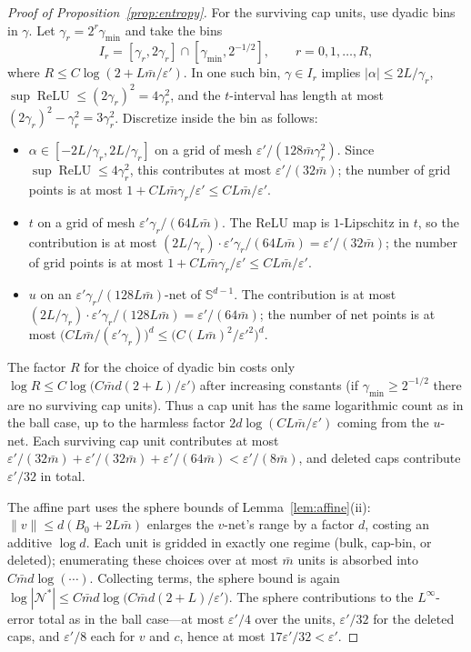 \documentclass[11pt,reqno]{amsart}
\theoremstyle{plain}
\theoremstyle{definition}
\theoremstyle{remark}
\newcommand{\Sd}{\mathbb{S}^{d-1}}
\newcommand{\eps}{\varepsilon}
\newcommand{\relu}{\operatorname{ReLU}}
\newcommand{\NN}{\mathcal{N}}
\begin{document}
\begin{proof}[Proof of Proposition~\textup{\ref{prop:entropy}}]
For the surviving cap units, use dyadic bins in $\gamma$.  Let $\gamma_r=2^r\gamma_{\min}$ and take the bins
\[
        I_r=[\gamma_r,2\gamma_r]\cap[\gamma_{\min},2^{-1/2}],\qquad r=0,1,\dots,R,
\]
where $R\le C\log(2+L\bar m/\eps')$.  In one such bin, $\gamma\in I_r$ implies $|\alpha|\le2L/\gamma_r$, $\sup\relu\le(2\gamma_r)^2=4\gamma_r^2$, and the $t$-interval has length at most $(2\gamma_r)^2-\gamma_r^2=3\gamma_r^2$.  Discretize inside the bin as follows:
\begin{itemize}
\item $\alpha\in[-2L/\gamma_r,2L/\gamma_r]$ on a grid of mesh $\eps'/(128\bar m\gamma_r^2)$.  Since $\sup\relu\le4\gamma_r^2$, this contributes at most $\eps'/(32\bar m)$; the number of grid points is at most $1+C L\bar m\gamma_r/\eps'\le C L\bar m/\eps'$.
\item $t$ on a grid of mesh $\eps'\gamma_r/(64L\bar m)$.  The ReLU map is $1$-Lipschitz in $t$, so the contribution is at most $(2L/\gamma_r)\cdot\eps'\gamma_r/(64L\bar m)=\eps'/(32\bar m)$; the number of grid points is at most $1+C L\bar m\gamma_r/\eps'\le C L\bar m/\eps'$.
\item $u$ on an $\eps'\gamma_r/(128L\bar m)$-net of $\Sd$.  The contribution is at most $(2L/\gamma_r)\cdot\eps'\gamma_r/(128L\bar m)=\eps'/(64\bar m)$; the number of net points is at most $\bigl(C L\bar m/(\eps'\gamma_r)\bigr)^d\le\bigl(C(L\bar m)^2/\eps'^2\bigr)^d$.
\end{itemize}
The factor $R$ for the choice of dyadic bin costs only $\log R\le C\log\bigl(C\bar md(2+L)/\eps'\bigr)$ after increasing constants (if $\gamma_{\min}\ge2^{-1/2}$ there are no surviving cap units).  Thus a cap unit has the same logarithmic count as in the ball case, up to the harmless factor $2d\log(C L\bar m/\eps')$ coming from the $u$-net.  Each surviving cap unit contributes at most $\eps'/(32\bar m)+\eps'/(32\bar m)+\eps'/(64\bar m)<\eps'/(8\bar m)$, and deleted caps contribute $\eps'/32$ in total.

The affine part uses the sphere bounds of Lemma~\ref{lem:affine}(ii): $\|v\|\le d(B_0+2L\bar m)$ enlarges the $v$-net's range by a factor $d$, costing an additive $\log d$. Each unit is gridded in exactly one regime (bulk, cap-bin, or deleted); enumerating these choices over at most $\bar m$ units is absorbed into $C\bar md\log(\cdots)$. Collecting terms, the sphere bound is again $\log|\NN^\ast|\le C\bar md\log\bigl(C\bar md(2+L)/\eps'\bigr)$. The sphere contributions to the $L^\infty$-error total as in the ball case---at most $\eps'/4$ over the units, $\eps'/32$ for the deleted caps, and $\eps'/8$ each for $v$ and $c$, hence at most $17\eps'/32<\eps'$.



\end{proof}
\end{document}
